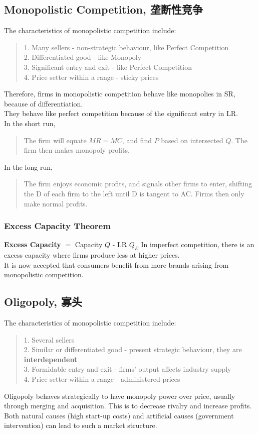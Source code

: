 \subsection{Monopolistic Competition, 垄断性竞争}
The characteristics of monopolistic competition include:
\begin{quote}
    1. Many sellers - non-strategic behaviour, like Perfect Competition \\
    2. Differentiated good - like Monopoly \\
    3. Significant entry and exit - like Perfect Competition \\
    4. Price setter within a range - sticky prices
\end{quote}
Therefore, firms in monopolistic competition behave like monopolies in SR, because of differentiation. \\
They behave like perfect competition because of the significant entry in LR. \\
In the short run,
\begin{quote}
    The firm will equate $MR = MC$, and find $P$ based on intersected $Q$. The firm then makes monopoly profits.
\end{quote}
In the long run,
\begin{quote}
    The firm enjoys economic profits, and signals other firms to enter, shifting the D of each firm to the left until D is tangent to AC. Firms then only make normal profits.
\end{quote}
\subsubsection{Excess Capacity Theorem}
\textbf{Excess Capacity} $=$ Capacity $Q$ - LR $Q_E$
In imperfect competition, there is an excess capacity where firms produce less at higher prices. \\
It is now accepted that consumers benefit from more brands arising from monopolistic competition.

\subsection{Oligopoly, 寡头}
The characteristics of monopolistic competition include:
\begin{quote}
    1. Several sellers\\
    2. Similar or differentiated good - present strategic behaviour, they are \textbf{interdependent} \\
    3. Formidable entry and exit - firms' output affects industry supply \\
    4. Price setter within a range - administered prices
\end{quote}
Oligopoly behaves strategically to have monopoly power over price, usually through merging and acquisition. This is to decrease rivalry and increase profits. \\
Both natural causes (high start-up costs) and artificial causes (government intervention) can lead to such a market structure.

